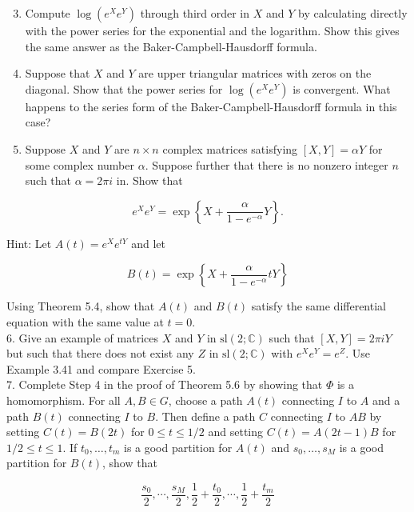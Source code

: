 \documentclass[10pt, letterpaper]{article}
\begin{document}
\begin{enumerate}
  \setcounter{enumi}{2}
  \item Compute $\log \left(e^{X} e^{Y}\right)$ through third order in $X$ and $Y$ by calculating directly with the power series for the exponential and the logarithm. Show this gives the same answer as the Baker-Campbell-Hausdorff formula.
  \item Suppose that $X$ and $Y$ are upper triangular matrices with zeros on the diagonal. Show that the power series for $\log \left(e^{X} e^{Y}\right)$ is convergent. What happens to the series form of the Baker-Campbell-Hausdorff formula in this case?
  \item Suppose $X$ and $Y$ are $n \times n$ complex matrices satisfying $[X, Y]=\alpha Y$ for some complex number $\alpha$. Suppose further that there is no nonzero integer $n$ such that $\alpha=2 \pi i$ in. Show that
\end{enumerate}

$$
e^{X} e^{Y}=\exp \left\{X+\frac{\alpha}{1-e^{-\alpha}} Y\right\} .
$$

Hint: Let $A(t)=e^{X} e^{t Y}$ and let

$$
B(t)=\exp \left\{X+\frac{\alpha}{1-e^{-\alpha}} t Y\right\}
$$

Using Theorem 5.4, show that $A(t)$ and $B(t)$ satisfy the same differential equation with the same value at $t=0$.\\
6. Give an example of matrices $X$ and $Y$ in $\mathrm{sl}(2 ; \mathbb{C})$ such that $[X, Y]=2 \pi i Y$ but such that there does not exist any $Z$ in $\mathrm{sl}(2 ; \mathbb{C})$ with $e^{X} e^{Y}=e^{Z}$. Use Example 3.41 and compare Exercise 5.\\
7. Complete Step 4 in the proof of Theorem 5.6 by showing that $\Phi$ is a homomorphism. For all $A, B \in G$, choose a path $A(t)$ connecting $I$ to $A$ and a path $B(t)$ connecting $I$ to $B$. Then define a path $C$ connecting $I$ to $A B$ by setting $C(t)=B(2 t)$ for $0 \leq t \leq 1 / 2$ and setting $C(t)=A(2 t-1) B$ for $1 / 2 \leq t \leq 1$. If $t_{0}, \ldots, t_{m}$ is a good partition for $A(t)$ and $s_{0}, \ldots, s_{M}$ is a good partition for $B(t)$, show that

$$
\frac{s_{0}}{2}, \cdots, \frac{s_{M}}{2}, \frac{1}{2}+\frac{t_{0}}{2}, \cdots, \frac{1}{2}+\frac{t_{m}}{2}
$$
\end{document}

